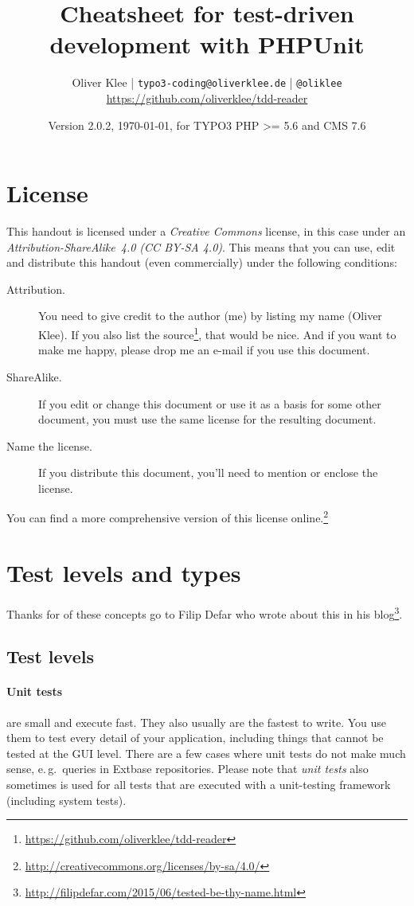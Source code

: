 \documentclass[a4paper,10pt,headsepline]{scrartcl}
\author{
  Oliver Klee | \texttt{typo3-coding@oliverklee.de} | \texttt{@oliklee} \\
  \url{https://github.com/oliverklee/tdd-reader}
}
\date{Version 2.0.2, \today, for TYPO3 PHP >= 5.6 and CMS 7.6}
\title{
  Cheatsheet for test-driven development with PHPUnit
}
\begin{document}
\maketitle

\section*{License}

This handout is licensed under a \emph{Creative Commons} license, in this case under an \emph{Attribution-ShareAlike~4.0 (CC BY-SA 4.0)}. This means that you can use, edit and distribute this handout (even commercially) under the following conditions:

\begin{description}
  \item[Attribution.] You need to give credit to the author (me) by listing my name (Oliver Klee). If you also list the source\footnote{\url{https://github.com/oliverklee/tdd-reader}}, that would be nice. And if you want to make me happy, please drop me an e-mail if you use this document.
  \item[ShareAlike.] If you edit or change this document or use it as a basis for some other document, you must use the same license for the resulting document.
  \item[Name the license.] If you distribute this document, you'll need to mention or enclose the license.
\end{description}

You can find a more comprehensive version of this license online.\footnote{\url{http://creativecommons.org/licenses/by-sa/4.0/}}


\pagebreak
\tableofcontents

\pagebreak
\section{Test levels and types}

Thanks for of these concepts go to Filip Defar who wrote about this in his blog\footnote{\url{http://filipdefar.com/2015/06/tested-be-thy-name.html}}.


\subsection{Test levels}

\paragraph{Unit tests} are small and execute fast. They also usually are the fastest to write. You use them to test every detail of your application, including things that cannot be tested at the GUI level. There are a few cases where unit tests do not make much sense, e.\,g.~queries in Extbase repositories. Please note that \emph{unit tests} also sometimes is used for all tests that are executed with a unit-testing framework (including system tests).
\end{document}
